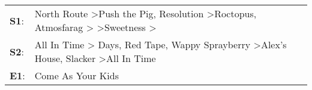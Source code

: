 \begin{supertabular}{p{0.03\textwidth}p{0.92\textwidth}}
 \textbf{S1}:  &  North Route\textsuperscript{} \textgreater \enspace Push the Pig\textsuperscript{}, \enspace Resolution\textsuperscript{} \textgreater \enspace Roctopus\textsuperscript{}, \enspace Atmosfarag\textsuperscript{} \textgreater {}\textsuperscript{} \textgreater \enspace Sweetness\textsuperscript{} \textgreater {}\textsuperscript{}  \enspace  \\
 \textbf{S2}:  &                                                   All In Time\textsuperscript{} \textgreater {} Days\textsuperscript{}, \enspace Red Tape\textsuperscript{}, \enspace Wappy Sprayberry\textsuperscript{} \textgreater \enspace Alex's House\textsuperscript{}, \enspace Slacker\textsuperscript{} \textgreater \enspace All In Time\textsuperscript{}  \enspace  \\
 \textbf{E1}:  &                                                                                                                                                                                                                                                                                                                            Come As Your Kids\textsuperscript{}  \enspace  \\
\end{supertabular}
